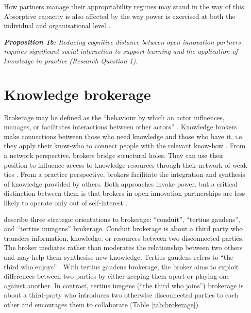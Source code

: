  How partners manage their appropriability regimes may stand in the way of this. Absorptive capacity is also affected by the way power is exercised at both the individual and organisational level \citep{todorova2007absorptive}. \bigskip

\begin{tcolorbox}
\textit{\textbf{Proposition 1b:} Reducing cognitive distance between open innovation partners  requires  significant  social  interaction  to support learning and the application of knowledge in practice (Research Question 1).}
\end{tcolorbox}

\section{Knowledge brokerage}

Brokerage may be defined as the \enquote{behaviour by which an actor influences, manages, or facilitates interactions between other actors} \citep{obstfeld2014brokerage}. Knowledge brokers make connections between those who need knowledge and those who have it, i.e. they apply their know-who to connect people with the relevant know-how \citep{davenport1998working}. From a network perspective, brokers bridge structural holes. They can use their position to influence access to knowledge resources through their network of weak ties \citep{burt1992structural,hanneman2005introduction,davis2010agency,simpson2011network,stovel2012brokerage}. From a practice perspective, brokers facilitate the integration and synthesis of knowledge provided by others. Both approaches invoke power, but a critical distinction between them is that brokers in open innovation partnerships are less likely to operate only out of self-interest \citep{lingo2010nexus,marabelli2016strategic}. \medskip

\citet{obstfeld2014brokerage} describe three strategic orientations to brokerage: \enquote{conduit}, \enquote{tertius gaudens}, and \enquote{tertius inungens} brokerage. Conduit brokerage is about a third party who transfers information, knowledge, or resources between two disconnected parties. The broker mediates rather than moderates the relationship between two others and may help them synthesise new knowledge. Tertius gaudens refers to \enquote{the third who enjoys} \citep{simmel1950sociology}. With tertius gaudens brokerage, the broker aims to exploit differences between two parties by either keeping them apart or playing one against another. In contrast, tertius iungens (\enquote{the third who joins}) brokerage is about a third-party who introduces two otherwise disconnected parties to each other and encourages them to collaborate (Table \ref{tab:brokerage}). \medskip

